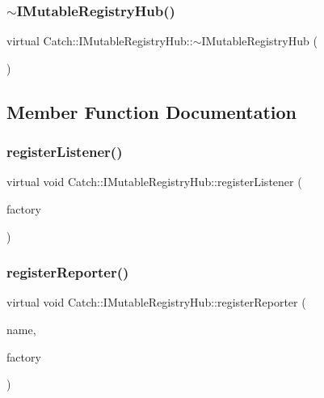 \subsubsection{\texorpdfstring{$\sim$\+I\+Mutable\+Registry\+Hub()}{~IMutableRegistryHub()}}
{\footnotesize\ttfamily virtual Catch\+::\+I\+Mutable\+Registry\+Hub\+::$\sim$\+I\+Mutable\+Registry\+Hub (\begin{DoxyParamCaption}{ }\end{DoxyParamCaption})\hspace{0.3cm}{\ttfamily [virtual]}}



\subsection{Member Function Documentation}
\hypertarget{struct_catch_1_1_i_mutable_registry_hub_ae06fcb90ba3f2b389d450cd81e229276}{}\label{struct_catch_1_1_i_mutable_registry_hub_ae06fcb90ba3f2b389d450cd81e229276} 
\subsubsection{\texorpdfstring{register\+Listener()}{registerListener()}}
{\footnotesize\ttfamily virtual void Catch\+::\+I\+Mutable\+Registry\+Hub\+::register\+Listener (\begin{DoxyParamCaption}\item[{\hyperlink{class_catch_1_1_ptr}{Ptr}$<$ I\+Reporter\+Factory $>$ const \&}]{factory }\end{DoxyParamCaption})\hspace{0.3cm}{\ttfamily [pure virtual]}}

\hypertarget{struct_catch_1_1_i_mutable_registry_hub_aab72d0aa1fa14627f1a6a4c893ae0a12}{}\label{struct_catch_1_1_i_mutable_registry_hub_aab72d0aa1fa14627f1a6a4c893ae0a12} 
\subsubsection{\texorpdfstring{register\+Reporter()}{registerReporter()}}
{\footnotesize\ttfamily virtual void Catch\+::\+I\+Mutable\+Registry\+Hub\+::register\+Reporter (\begin{DoxyParamCaption}\item[{std\+::string const \&}]{name,  }\item[{\hyperlink{class_catch_1_1_ptr}{Ptr}$<$ I\+Reporter\+Factory $>$ const \&}]{factory }\end{DoxyParamCaption})\hspace{0.3cm}{\ttfamily [pure virtual]}}

